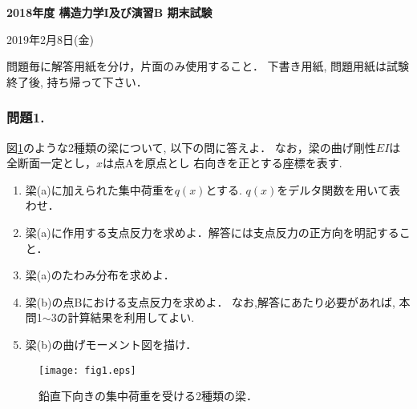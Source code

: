 \documentclass[10pt,a4j]{jarticle}
\newlength{\minitwocolumn}
\begin{document}
\newcommand{\fat}[1]{\mbox{\boldmath $#1$}}
\newcommand{\D}{\partial}
\newcommand{\w}{\omega}
\newcommand{\ga}{\alpha}
\newcommand{\gb}{\beta}
\newcommand{\gx}{\xi}
\newcommand{\gz}{\zeta}
\newcommand{\vhat}[1]{\hat{\fat{#1}}}
\newcommand{\spc}{\vspace{0.7\baselineskip}}
\newcommand{\halfspc}{\vspace{0.3\baselineskip}}

\newcommand{\twofig}[2]
 {
   \begin{figure}[h]
     \begin{minipage}[t]{\minitwocolumn}
         \begin{center}   #1
         \end{center}
     \end{minipage}
         \hspace{\columnsep}
     \begin{minipage}[t]{\minitwocolumn}
         \begin{center} #2
         \end{center}
     \end{minipage}
   \end{figure}
 }
\begin{center}
{\Large \bf 2018年度 構造力学I及び演習B 期末試験} \\
\end{center}
\begin{flushright}
	2019年2月8日(金)
\end{flushright}
問題毎に解答用紙を分け，片面のみ使用すること．
下書き用紙, 問題用紙は試験終了後, 持ち帰って下さい．
%
%
%
\subsubsection*{問題1.}
図\ref{fig:fig1}のような2種類の梁について, 以下の問に答えよ．
なお，梁の曲げ剛性$EI$は全断面一定とし，$x$は点Aを原点とし
右向きを正とする座標を表す. 
\begin{enumerate}
\item
	梁(a)に加えられた集中荷重を$q(x)$とする. $q(x)$をデルタ関数を用いて表わせ．
\item
	梁(a)に作用する支点反力を求めよ．解答には支点反力の正方向を明記すること．
\item
	梁(a)のたわみ分布を求めよ．
\item
	梁(b)の点Bにおける支点反力を求めよ．
	なお,解答にあたり必要があれば, 本問1$\sim$3の計算結果を利用してよい.
\item
	梁(b)の曲げモーメント図を描け．
\end{enumerate}
\begin{figure}[h]
	\begin{center}
	\texttt{[image: fig1.eps]} 
	\end{center}
	\caption{鉛直下向きの集中荷重を受ける2種類の梁．} 
	\label{fig:fig1}
\end{figure}
\newpage
\end{document}
